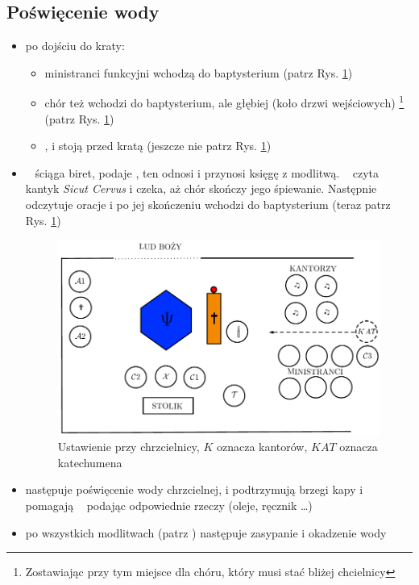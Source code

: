 \subsection{Poświęcenie wody}
\begin{itemize}
	\item po dojściu do kraty:
	      \begin{itemize}
		      \item ministranci funkcyjni wchodzą do baptysterium (patrz Rys.
		            \ref{fig:woda})
		      \item chór też wchodzi do baptysterium, ale głębiej (koło drzwi
		            wejściowych) \footnote{Zostawiając przy tym miejsce dla
			            chóru, który musi stać bliżej chcielnicy} (patrz Rys.
		            \ref{fig:woda})
		      \item \ii,  i  stoją przed kratą (jeszcze nie patrz Rys.
		            \ref{fig:woda})
	      \end{itemize}
	\item \ii~ ściąga biret, podaje , ten odnosi i przynosi księgę z
	      modlitwą. \ii~ czyta kantyk \textit{Sicut Cervus} i czeka, aż chór
	      skończy jego śpiewanie. Następnie odczytuje oracje i po jej skończeniu
	      wchodzi do baptysterium (teraz patrz Rys. \ref{fig:woda})
	      \begin{figure}[h!]
		      \centering
		      \includegraphics[width=0.7\linewidth]{Figures/Sobota/woda.pdf}
		      \caption{Ustawienie przy chrzcielnicy, $K$ oznacza kantorów, $KAT$
			      oznacza katechumena}
		      \label{fig:woda}
	      \end{figure}
	\item następuje poświęcenie wody chrzcielnej,  i  podtrzymują brzegi
	      kapy i pomagają \ii~ podając odpowiednie rzeczy (oleje, ręcznik \dots)
	\item po wszystkich modlitwach (patrz \textit{}) następuje
	      zasypanie i okadzenie wody
\end{itemize}
